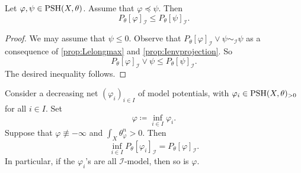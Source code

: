 \begin{lemma}\label{lma:PIenvmono1}
    Let $\varphi,\psi\in \mathrm{PSH}(X,\theta)$. Assume that $\varphi\preceq \psi$. Then
    \[
        P_{\theta}[\varphi]_{\mathcal{I}}\leq P_{\theta}[\psi]_{\mathcal{I}}.
    \]
\end{lemma}
\begin{proof}
    We may assume that $\psi\leq 0$.
    Observe that $P_{\theta}[\varphi]_{\mathcal{I}}\lor \psi\sim_{\mathcal{I}} \psi$ as a consequence of \cref{prop:Lelongmax} and \cref{prop:Ienvprojection}. So
    \[
    P_{\theta}[\varphi]_{\mathcal{I}}\lor \psi\leq P_{\theta}[\psi]_{\mathcal{I}}.
    \]
    The desired inequality follows.
\end{proof}

\begin{proposition}\label{prop:decnetmodelPI}
    Consider a decreasing net $(\varphi_i)_{i\in I}$ of model potentials, with $\varphi_i\in \mathrm{PSH}(X,\theta)_{>0}$ for all $i\in I$. Set
    \[
    \varphi\coloneqq \inf_{i\in I}\varphi_i.
    \]
    Suppose that $\varphi\not\equiv -\infty$ and $\int_X \theta_{\varphi}^n>0$. Then
    \[
        \inf_{i\in I} P_{\theta}[\varphi_i]_{\mathcal{I}}=P_{\theta}[\varphi]_{\mathcal{I}}.
    \]
    In particular, if the $\varphi_i$'s are all $\mathcal{I}$-model, then so is $\varphi$.
\end{proposition}
